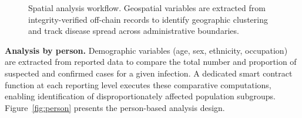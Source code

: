 \documentclass[AMA,LATO1COL]{WileyNJD-v2}
\begin{document}
\begin{figure}[!ht]
\centering
{}
\caption{Spatial analysis workflow. Geospatial variables are extracted from integrity-verified off-chain records to identify geographic clustering and track disease spread across administrative boundaries.}\label{fig:spatial}
\end{figure}
%
%
%

\textbf{Analysis by person.} Demographic variables (age, sex, ethnicity, occupation) are extracted from reported data to compare the total number and proportion of suspected and confirmed cases for a given infection. A dedicated smart contract function at each reporting level executes these comparative computations, enabling identification of disproportionately affected population subgroups. Figure~\ref{fig:person} presents the person-based analysis design.
\end{document}
